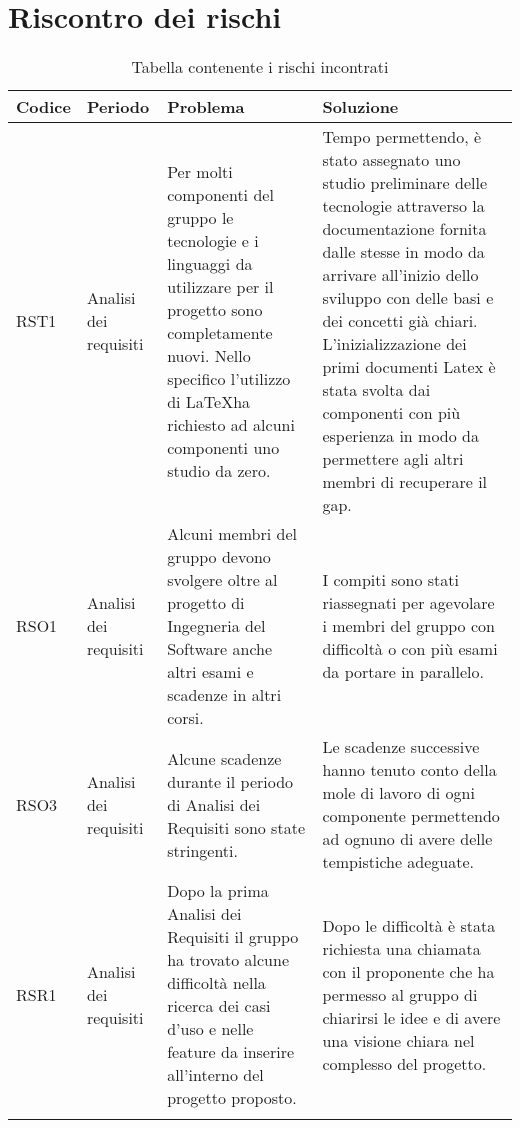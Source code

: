 \appendix
\section{Riscontro dei rischi} \label{_riscontroDeiRischi}
\begin{center}
			\begin{longtable}{p{2cm}|p{3cm}|p{4cm}|p{4cm}|}
			\hline
			\rowcolor{lighter-grayer}
			\textbf{Codice} & \textbf{Periodo} & \textbf{Problema} & \textbf{Soluzione} \\
			\hline
			\endfirsthead

			\hline
			RST1 & Analisi dei requisiti & Per molti componenti del gruppo le tecnologie e i linguaggi da utilizzare per il progetto sono completamente nuovi. Nello specifico l'utilizzo di \LaTeX ha richiesto ad alcuni componenti uno studio da zero. & Tempo permettendo, è stato assegnato uno studio preliminare delle tecnologie attraverso la documentazione fornita dalle stesse in modo da arrivare all'inizio dello sviluppo con delle basi e dei concetti già chiari. L'inizializzazione dei primi documenti Latex è stata svolta dai componenti con più esperienza in modo da permettere agli altri membri di recuperare il gap. \\
			\hline
			RSO1 & Analisi dei requisiti & Alcuni membri del gruppo devono svolgere oltre al progetto di Ingegneria del Software anche altri esami e scadenze in altri corsi. & I compiti sono stati riassegnati per agevolare i membri del gruppo con difficoltà o con più esami da portare in parallelo. \\
			\hline
			RSO3 & Analisi dei requisiti & Alcune scadenze durante il periodo di Analisi dei Requisiti sono state stringenti. & Le scadenze successive hanno tenuto conto della mole di lavoro di ogni componente permettendo ad ognuno di avere delle tempistiche adeguate. \\
			\hline
			RSR1 & Analisi dei requisiti & Dopo la prima Analisi dei Requisiti il gruppo ha trovato alcune difficoltà nella ricerca dei casi d'uso e nelle feature da inserire all'interno del progetto proposto. & Dopo le difficoltà è stata richiesta una chiamata con il proponente che ha permesso al gruppo di chiarirsi le idee e di avere una visione chiara nel complesso del progetto. \\
			\rowcolor{white} 
			\caption{Tabella contenente i rischi incontrati}
	\end{longtable}
\end{center}